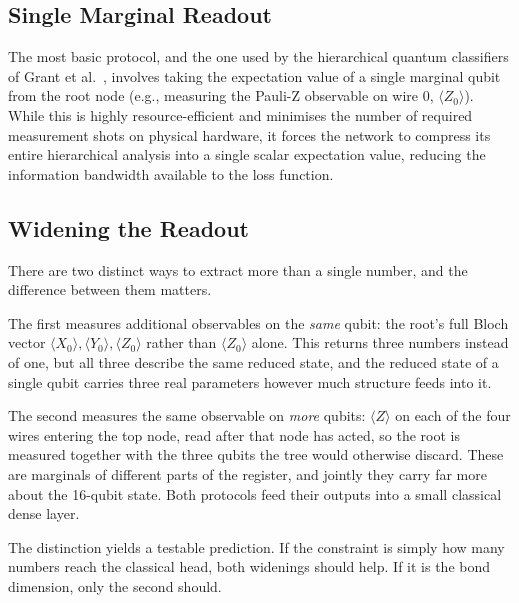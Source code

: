 \documentclass[12pt, a4paper, oneside]{report}
\begin{document}
\subsection{Single Marginal Readout}
The most basic protocol, and the one used by the hierarchical quantum classifiers of Grant et al.\ \cite{grant2018hierarchical}, involves taking the expectation value of a single marginal qubit from the root node (e.g., measuring the Pauli-Z observable on wire 0, $\langle Z_0 \rangle$). While this is highly resource-efficient and minimises the number of required measurement shots on physical hardware, it forces the network to compress its entire hierarchical analysis into a single scalar expectation value, reducing the information bandwidth available to the loss function.

\subsection{Widening the Readout}
There are two distinct ways to extract more than a single number, and the difference between them matters.

The first measures additional observables on the \emph{same} qubit: the root's full Bloch vector $\langle X_0 \rangle, \langle Y_0 \rangle, \langle Z_0 \rangle$ rather than $\langle Z_0 \rangle$ alone. This returns three numbers instead of one, but all three describe the same reduced state, and the reduced state of a single qubit carries three real parameters however much structure feeds into it.

The second measures the same observable on \emph{more} qubits: $\langle Z \rangle$ on each of the four wires entering the top node, read after that node has acted, so the root is measured together with the three qubits the tree would otherwise discard. These are marginals of different parts of the register, and jointly they carry far more about the 16-qubit state. Both protocols feed their outputs into a small classical dense layer.

The distinction yields a testable prediction. If the constraint is simply how many numbers reach the classical head, both widenings should help. If it is the bond dimension, only the second should.
\end{document}
